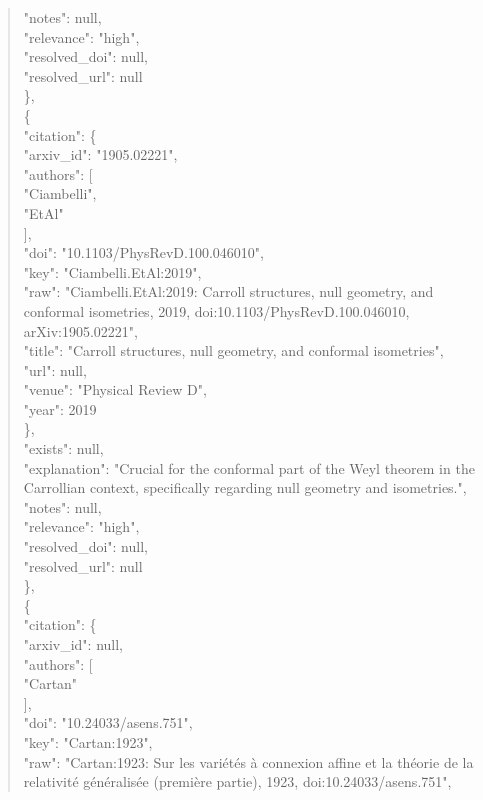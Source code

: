 \documentclass[11pt]{article}
\begin{document}
\begin{quote}
      "notes": null,\\
      "relevance": "high",\\
      "resolved\_doi": null,\\
      "resolved\_url": null\\
    \},\\
    \{\\
      "citation": \{\\
        "arxiv\_id": "1905.02221",\\
        "authors": [\\
          "Ciambelli",\\
          "EtAl"\\
        ],\\
        "doi": "10.1103/PhysRevD.100.046010",\\
        "key": "Ciambelli.EtAl:2019",\\
        "raw": "Ciambelli.EtAl:2019: Carroll structures, null geometry, and conformal isometries, 2019, doi:10.1103/PhysRevD.100.046010, arXiv:1905.02221",\\
        "title": "Carroll structures, null geometry, and conformal isometries",\\
        "url": null,\\
        "venue": "Physical Review D",\\
        "year": 2019\\
      \},\\
      "exists": null,\\
      "explanation": "Crucial for the conformal part of the Weyl theorem in the Carrollian context, specifically regarding null geometry and isometries.",\\
      "notes": null,\\
      "relevance": "high",\\
      "resolved\_doi": null,\\
      "resolved\_url": null\\
    \},\\
    \{\\
      "citation": \{\\
        "arxiv\_id": null,\\
        "authors": [\\
          "Cartan"\\
        ],\\
        "doi": "10.24033/asens.751",\\
        "key": "Cartan:1923",\\
        "raw": "Cartan:1923: Sur les variétés à connexion affine et la théorie de la relativité généralisée (première partie), 1923, doi:10.24033/asens.751",\\

\end{quote}
\end{document}

